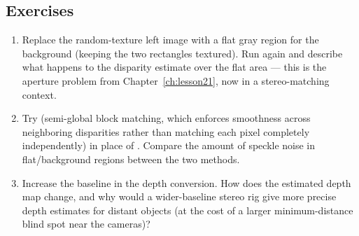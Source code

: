 \subsection*{Exercises}
\begin{enumerate}
  \item Replace the random-texture left image with a flat gray region for the background (keeping the two rectangles textured). Run  again and describe what happens to the disparity estimate over the flat area --- this is the aperture problem from Chapter~\ref{ch:lesson21}, now in a stereo-matching context.
  \item Try  (semi-global block matching, which enforces smoothness across neighboring disparities rather than matching each pixel completely independently) in place of . Compare the amount of speckle noise in flat/background regions between the two methods.
  \item Increase the baseline in the depth conversion. How does the estimated depth map change, and why would a wider-baseline stereo rig give more precise depth estimates for distant objects (at the cost of a larger minimum-distance blind spot near the cameras)?
\end{enumerate}

\vfill
{}
